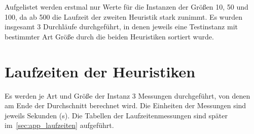 \documentclass[a4paper, 10pt, twoside, onecolumn, parskip]{scrartcl}
\begin{document}
    Aufgelistet werden erstmal nur Werte für die Instanzen der Größen 10, 50 und 100, da ab 500 die Laufzeit der zweiten Heuristik stark zunimmt.
    Es wurden insgesamt 3 Durchläufe durchgeführt, in denen jeweils eine Testinstanz mit bestimmter Art Größe durch die beiden Heuristiken sortiert wurde.




    \section{Laufzeiten der Heuristiken} \label{sec:laufzeiten}

    Es werden je Art und Größe der Instanz 3 Messungen durchgeführt, von denen am Ende der Durchschnitt berechnet wird.
    Die Einheiten der Messungen sind jeweils Sekunden (s).
    Die Tabellen der Laufzeitenmessungen sind später im~\autoref{sec:app_laufzeiten} aufgeführt.
\end{document}
